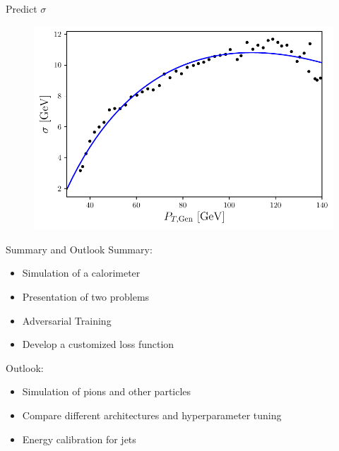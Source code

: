 \documentclass[10pt]{beamer}
\begin{document}
\begin{frame}{Predict $\sigma$}
  \begin{figure}[hbtp]
    \centering
    \includegraphics[width=.9\linewidth]{../images/sigma_fit.pdf}
  \end{figure}
\end{frame}

\begin{frame}{Summary and Outlook}
    Summary:
  \begin{itemize}
  \item Simulation of a calorimeter
  \item Presentation of two problems
  \item Adversarial Training
  \item Develop a customized loss function
  \end{itemize}
  Outlook:
  \begin{itemize}
  \item Simulation of pions and other particles
  \item Compare different architectures and hyperparameter tuning
  \item Energy calibration for jets
  \end{itemize}
\end{frame}
\end{document}
